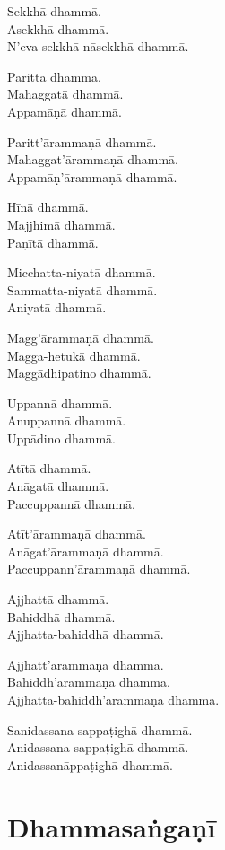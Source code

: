 Sekkhā dhammā.\\
Asekkhā dhammā.\\
N'eva sekkhā nāsekkhā dhammā.

Parittā dhammā.\\
Mahaggatā dhammā.\\
Appamāṇā dhammā.

\clearpage

Paritt'ārammaṇā dhammā.\\
Mahaggat'ārammaṇā dhammā.\\
Appamāṇ'ārammaṇā dhammā.

Hīnā dhammā.\\
Majjhimā dhammā.\\
Paṇītā dhammā.

Micchatta-niyatā dhammā.\\
Sammatta-niyatā dhammā.\\
Aniyatā dhammā.

Magg'ārammaṇā dhammā.\\
Magga-hetukā dhammā.\\
Maggādhipatino dhammā.

Uppannā dhammā.\\
Anuppannā dhammā.\\
Uppādino dhammā.

Atītā dhammā.\\
Anāgatā dhammā.\\
Paccuppannā dhammā.

Atīt'ārammaṇā dhammā.\\
Anāgat'ārammaṇā dhammā.\\
Paccuppann'ārammaṇā dhammā.

\clearpage

Ajjhattā dhammā.\\
Bahiddhā dhammā.\\
Ajjhatta-bahiddhā dhammā.

Ajjhatt'ārammaṇā dhammā.\\
Bahiddh'ārammaṇā dhammā.\\
Ajjhatta-bahiddh'ārammaṇā dhammā.

Sanidassana-sappaṭighā dhammā.\\
Anidassana-sappaṭighā dhammā.\\
Anidassanāppaṭighā dhammā.


\section{Dhammasaṅgaṇī}

